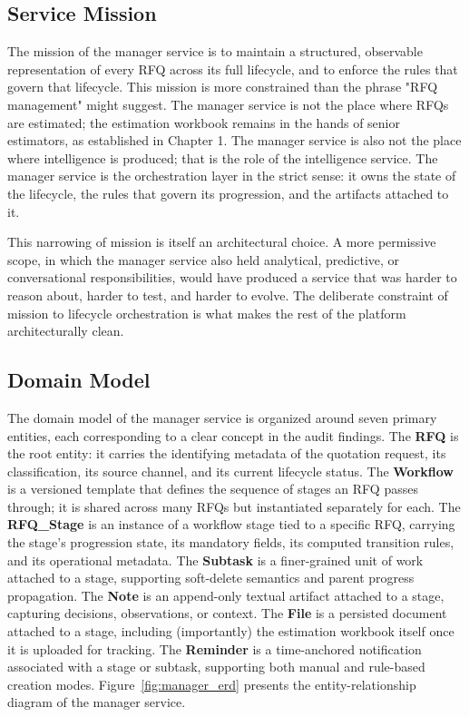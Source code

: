 \subsection*{Service Mission}
The mission of the manager service is to maintain a structured, observable representation of every RFQ across its full lifecycle, and to enforce the rules that govern that lifecycle. This mission is more constrained than the phrase "RFQ management" might suggest. The manager service is not the place where RFQs are estimated; the estimation workbook remains in the hands of senior estimators, as established in Chapter 1. The manager service is also not the place where intelligence is produced; that is the role of the intelligence service. The manager service is the orchestration layer in the strict sense: it owns the state of the lifecycle, the rules that govern its progression, and the artifacts attached to it.

This narrowing of mission is itself an architectural choice. A more permissive scope, in which the manager service also held analytical, predictive, or conversational responsibilities, would have produced a service that was harder to reason about, harder to test, and harder to evolve. The deliberate constraint of mission to lifecycle orchestration is what makes the rest of the platform architecturally clean.

\subsection*{Domain Model}
The domain model of the manager service is organized around seven primary entities, each corresponding to a clear concept in the audit findings. The \textbf{RFQ} is the root entity: it carries the identifying metadata of the quotation request, its classification, its source channel, and its current lifecycle status. The \textbf{Workflow} is a versioned template that defines the sequence of stages an RFQ passes through; it is shared across many RFQs but instantiated separately for each. The \textbf{RFQ\_Stage} is an instance of a workflow stage tied to a specific RFQ, carrying the stage's progression state, its mandatory fields, its computed transition rules, and its operational metadata. The \textbf{Subtask} is a finer-grained unit of work attached to a stage, supporting soft-delete semantics and parent progress propagation. The \textbf{Note} is an append-only textual artifact attached to a stage, capturing decisions, observations, or context. The \textbf{File} is a persisted document attached to a stage, including (importantly) the estimation workbook itself once it is uploaded for tracking. The \textbf{Reminder} is a time-anchored notification associated with a stage or subtask, supporting both manual and rule-based creation modes. Figure~\ref{fig:manager_erd} presents the entity-relationship diagram of the manager service.

